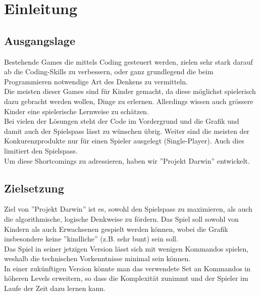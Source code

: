 \documentclass[11pt,a4paper,titlepage]{article}
\begin{document}
\newpage

\section{Einleitung}
\subsection{Ausgangslage}


Bestehende Games die mittels Coding gesteuert werden, zielen sehr stark darauf ab die Coding-Skills zu verbessern, oder ganz grundlegend die beim Programmieren notwendige Art des Denkens zu vermitteln.\\
Die meisten dieser Games sind für Kinder gemacht, da diese möglichst spielerisch dazu gebracht werden wollen, Dinge zu erlernen. Allerdings wissen auch grössere Kinder eine spielerische Lernweise zu schätzen. \\
Bei vielen der Lösungen steht der Code im Vordergrund und die Grafik und damit auch der Spielspass lässt zu wünschen übrig. 
Weiter sind die meisten der Konkurenzprodukte nur für einen Spieler ausgelegt (Single-Player). Auch dies limitiert den Spielspass.\\
Um diese Shortcomings zu adressieren, haben wir ''Projekt Darwin'' entwickelt.

\subsection{Zielsetzung}



Ziel von ''Projekt Darwin'' ist es, sowohl den Spielspass zu maximieren, als auch die algorithmische, logische Denkweise zu fördern. Das Spiel soll sowohl von Kindern als auch Erwachsenen gespielt werden können, wobei die Grafik insbesondere keine ''kindliche'' (z.B. sehr bunt) sein soll.\\
Das Spiel in seiner jetzigen Version lässt sich mit wenigen Kommandos spielen, weshalb die technischen Vorkenntnisse minimal sein können.\\
In einer zukünftigen Version könnte man das verwendete Set an Kommandos in höheren Levels erweitern, so dass die Komplexität zunimmt und der Spieler im Laufe der Zeit dazu lernen kann.
\end{document}
